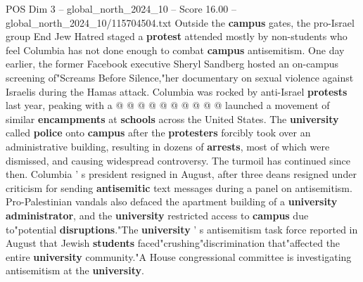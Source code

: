 \begin{textsample}{POS Dim 3 – global\_north\_2024\_10 – Score 16.00 – global\_north\_2024\_10/115704504.txt}
Outside the \textbf{campus} gates, the pro-Israel group End Jew Hatred staged a \textbf{protest} attended mostly by non-students who feel Columbia has not done enough to combat \textbf{campus} antisemitism.
One day earlier, the former Facebook executive Sheryl Sandberg hosted an on-campus screening of"Screams Before Silence,"her documentary on sexual violence against Israelis during the Hamas attack.
Columbia was rocked by anti-Israel \textbf{protests} last year, peaking with a @ @ @ @ @ @ @ @ @ @ launched a movement of similar \textbf{encampments} at \textbf{schools} across the United States.
The \textbf{university} called \textbf{police} onto \textbf{campus} after the \textbf{protesters} forcibly took over an administrative building, resulting in dozens of \textbf{arrests}, most of which were dismissed, and causing widespread controversy.
The turmoil has continued since then.
Columbia ' s president resigned in August, after three deans resigned under criticism for sending \textbf{antisemitic} text messages during a panel on antisemitism.
Pro-Palestinian vandals also defaced the apartment building of a \textbf{university} \textbf{administrator}, and the \textbf{university} restricted access to \textbf{campus} due to"potential \textbf{disruptions}."The \textbf{university} ' s antisemitism task force reported in August that Jewish \textbf{students} faced"crushing"discrimination that"affected the entire \textbf{university} community."A House congressional committee is investigating antisemitism at the \textbf{university}.

\end{textsample}
